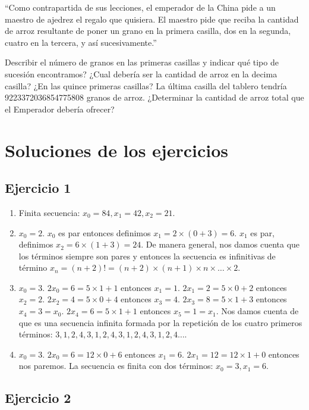 ``Como contrapartida de sus lecciones, el emperador de la China pide a un
maestro de ajedrez el regalo que quisiera.
El maestro pide que reciba la cantidad de arroz resultante de poner un grano en
la primera casilla, dos en la segunda, cuatro en la tercera, y así
sucesivamente.''

Describir el número de granos en las primeras casillas y indicar qué tipo
de sucesión encontramos? ¿Cual debería ser la cantidad de arroz en la decima
casilla? ¿En las quince primeras casillas?
La última casilla del tablero tendría 9223372036854775808 granos de arroz.
¿Determinar la cantidad de arroz total que el Emperador debería ofrecer?

\section{Soluciones de los ejercicios}

\subsection*{Ejercicio 1}

\begin{enumerate}
\item Finita secuencia: $x_0 = 84, x_1=42, x_2 = 21$. 
\item $x_0 = 2$. $x_0$ es par entonces definimos $x_1 = 2 \times {(0+3)} = 6$.
  $x_1$ es par, definimos $x_2 = 6 \times {(1+3)} = 24$. De manera general,
  nos damos cuenta que los términos siempre son pares y entonces la secuencia
  es infinitivas de término $x_n = {(n+2)}! =
  {(n+2)} \times {(n+1)} \times n \times \ldots \times 2$.
\item $x_0 = 3$. $2 x_0 = 6 = 5 \times 1 + 1$ entonces $x_1 = 1$.
  $2 x_1 = 2 = 5 \times 0 + 2$ entonces $x_2 = 2$.
  $2 x_2 = 4 = 5 \times 0 + 4$ entonces $x_3 = 4$.
  $2 x_3 = 8 = 5 \times 1 + 3$ entonces $x_4 = 3 = x_0$.
  $2 x_4 = 6 = 5 \times 1 + 1$ entonces $x_5 = 1 = x_1$. Nos damos cuenta de
  que es una secuencia infinita formada por la repetición de los cuatro primeros
  términos: $3,1,2,4,3,1,2,4,3,1,2,4,3,1,2,4\ldots$.
\item $x_0 = 3$. $2 x_0 = 6 = 12 \times 0 + 6$ entonces $x_1 = 6$.
  $2 x_1 = 12 = 12 \times 1 + 0$ entonces nos paremos. La secuencia es finita
  con dos términos: $x_0=3, x_1=6$.
\end{enumerate}

\subsection*{Ejercicio 2}

